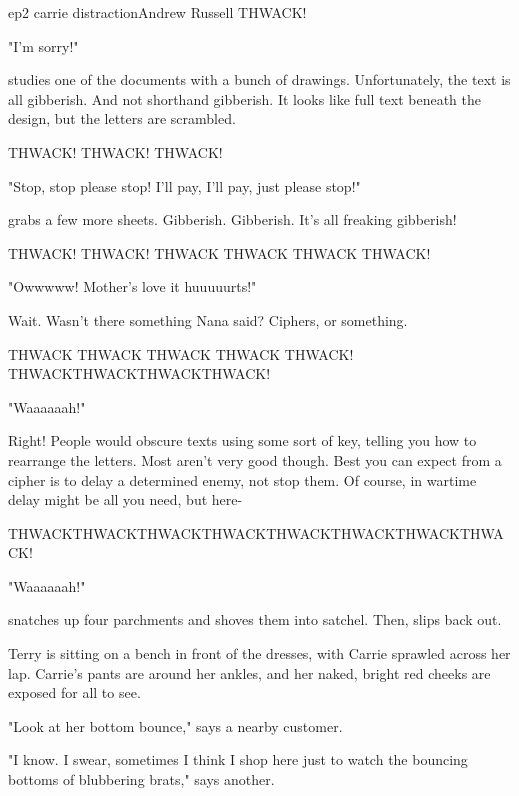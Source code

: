 \documentclass{book}
\begin{document}
\begin{childnode}{ep2 carrie distraction}{Andrew Russell}
    THWACK!

    "I'm sorry!" 

    \name{} studies one of the documents with a bunch of drawings. Unfortunately, the text is all gibberish. And not shorthand gibberish. It looks like full text beneath the design, but the letters
    are scrambled.

    THWACK! THWACK! THWACK!

    "Stop, stop please stop! I'll pay, I'll pay, just please stop!"

    \name{} grabs a few more sheets. Gibberish. Gibberish. It's all freaking gibberish!

    THWACK! THWACK! THWACK THWACK THWACK THWACK!

    "Owwwww! Mother's love it huuuuurts!"

    Wait. Wasn't there something Nana said? Ciphers, or something. 

    THWACK THWACK THWACK THWACK THWACK! THWACKTHWACKTHWACKTHWACK!

    "Waaaaaah!"

    Right! People would obscure texts using some sort of key, telling you how to rearrange the letters. Most aren't very good though. Best you can expect from a cipher is to delay a determined
    enemy, not stop them. Of course, in wartime delay might be all you need, but here-

    THWACKTHWACKTHWACKTHWACKTHWACKTHWACKTHWACKTHWACK!

    "Waaaaaah!"

    \name{} snatches up four parchments and shoves them into \hisher{} satchel. Then, \heshe{} slips back out.

    Terry is sitting on a bench in front of the dresses, with Carrie sprawled across her lap. Carrie's pants are around her ankles, and her naked, bright red cheeks are exposed for all to see. 

    "Look at her bottom bounce," says a nearby customer.

    "I know. I swear, sometimes I think I shop here just to watch the bouncing bottoms of blubbering brats," says another.


\end{childnode}
\end{document}
